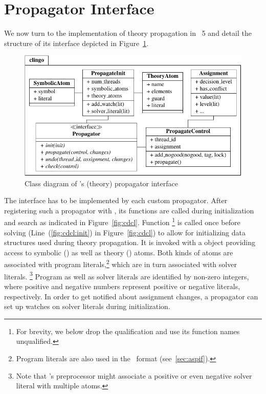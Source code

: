 \section{Propagator Interface}\label{sec:system}

We now turn to the implementation of theory propagation in \clingo~5
and detail the structure of its interface depicted in Figure~\ref{fig:interface}.
%
\begin{figure}
  \includegraphics[width=\textwidth]{figures/python-interface}
  \caption{Class diagram of \clingo's (theory) propagator interface\label{fig:interface}}
\end{figure}
%
The interface  has to be implemented by each custom propagator.
After registering such a propagator with \clingo,
its functions are called during initialization and search as indicated %
in Figure~\ref{fig:cdcl}.
%
Function %
\footnote{For brevity, we below drop the qualification  and use its function names unqualified.}
is called once before solving (Line~(\ref{fig:cdcl:init}) in Figure~\ref{fig:cdcl})
to allow for initializing data structures used during theory propagation.
It is invoked with a  object providing access to symbolic () as well as theory () atoms.
Both kinds of atoms are associated with program literals,\footnote{Program literals are also used in the \aspif\ format (see~\ref{sec:aspif}).} %
which are in turn associated with solver literals.%
\footnote{Note that \clasp's preprocessor might associate a positive or even negative solver literal with multiple atoms.}
Program as well as solver literals are identified by non-zero integers, where positive and negative numbers represent positive or  negative literals, respectively.
In order to get notified about assignment changes, a propagator can set up watches on solver literals during initialization.

